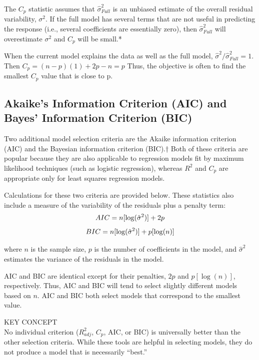 \documentclass[
]{report}
\begin{document}
The \(C_p\) statistic assumes that \(\hat{\sigma}^2_{Full}\) is an unbiased estimate of the overall residual variability, \(\sigma^2\). If the full model has several terms that are not useful in predicting the response (i.e., several coefficients are essentially zero), then \(\hat{\sigma}^2_{Full}\) will overestimate \(\sigma^2\) and \(C_p\) will be small.*

When the current model explains the data as well as the full model, \(\hat{\sigma}^2 / \hat{\sigma}^2_{Full} = 1\). Then \(C_p = (n - p)(1) + 2p - n = p\) Thus, the objective is often to find the smallest \(C_p\) value that is close to p.

\subsection*{Akaike's Information Criterion (AIC) and Bayes' Information Criterion (BIC)}\label{akaikes-information-criterion-aic-and-bayes-information-criterion-bic}

Two additional model selection criteria are the Akaike information criterion (AIC) and the Bayesian information criterion (BIC).† Both of these criteria are popular because they are also applicable to regression models fit by maximum likelihood techniques (such as logistic regression), whereas \(R^2\) and \(C_p\) are appropriate only for least squares regression models.

Calculations for these two criteria are provided below. These statistics also include a measure of the variability of the residuals plus a penalty term:
\begin{equation}
AIC = n[\log(\hat{\sigma}^2)] + 2p \notag
\end{equation}
\begin{equation}
BIC = n[\log(\hat{\sigma}^2)] + p[\log(n)] \notag
\end{equation}

where \(n\) is the sample size, \(p\) is the number of coefficients in the model, and \(\hat{\sigma}^2\) estimates the variance of the residuals in the model.

AIC and BIC are identical except for their penalties, \(2p\) and \(p[\log(n)]\), respectively. Thus, AIC and BIC will tend to select slightly different models based on \(n\). AIC and BIC both select models that correspond to the smallest value.

KEY CONCEPT\\
No individual criterion (\(R^2_{adj}\), \(C_p\), AIC, or BIC) is universally better than the other selection criteria. While these tools are helpful in selecting models, they do not produce a model that is necessarily ``best.''
\end{document}
